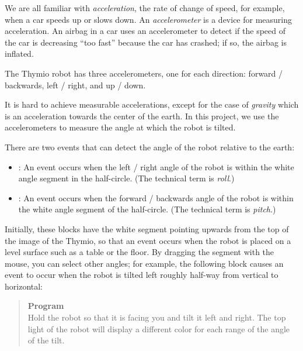 
\label{ch.angles}

We are all familiar with \emph{acceleration}, the rate of change of
speed, for example, when a car speeds up or slows down. An
\emph{accelerometer} is a device for measuring acceleration. An airbag
in a car uses an accelerometer to detect if the speed of the car is
decreasing ``too fast'' because the car has crashed; if so, the airbag
is inflated.

The Thymio robot has three accelerometers, one for each direction:
forward / backwards, left / right, and up / down.


It is hard to achieve measurable accelerations, except for the case of
\emph{gravity} which is an acceleration towards the center of the earth.
In this project, we use the accelerometers to measure the angle at which
the robot is tilted.

There are two events that can detect the angle of the robot relative to
the earth: \label{p.accel}

\begin{itemize}

\item {}: An event occurs when the left / right angle of
the robot is within the white angle segment in the half-circle. (The
technical term is \emph{roll}.)

\item {}: An event occurs when the forward /
backwards angle of the robot is within the white angle segment of the
half-circle. (The technical term is \emph{pitch}.)

\end{itemize}

Initially, these blocks have the white segment pointing upwards from the
top of the image of the Thymio, so that an event occurs when the robot
is placed on a level surface such as a table or the floor. By dragging
the segment with the mouse, you can select other angles; for
example, the following block causes an event to occur when the robot is
tilted left roughly half-way from vertical to horizontal:


\begin{quote}
\textbf{Program}\\
Hold the robot so that it is facing you and tilt it left and right. The
top light of the robot will display a different color for each range
of the angle of the tilt.
\end{quote}

